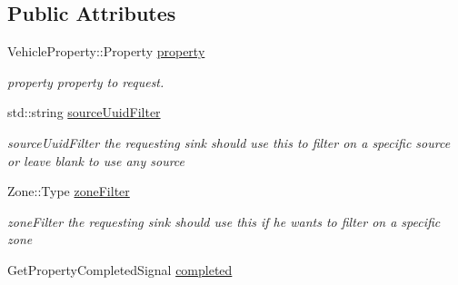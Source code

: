 \subsection*{Public Attributes}
\begin{DoxyCompactItemize}
\item 
\hypertarget{classAsyncPropertyRequest_a221de270e3fb828ddbe821aa484a553f}{Vehicle\-Property\-::\-Property \hyperlink{classAsyncPropertyRequest_a221de270e3fb828ddbe821aa484a553f}{property}}\label{classAsyncPropertyRequest_a221de270e3fb828ddbe821aa484a553f}

\begin{DoxyCompactList}\small\item\em property property to request. \end{DoxyCompactList}\item 
\hypertarget{classAsyncPropertyRequest_a2250e8d29929dd879de141049ec78302}{std\-::string \hyperlink{classAsyncPropertyRequest_a2250e8d29929dd879de141049ec78302}{source\-Uuid\-Filter}}\label{classAsyncPropertyRequest_a2250e8d29929dd879de141049ec78302}

\begin{DoxyCompactList}\small\item\em source\-Uuid\-Filter the requesting sink should use this to filter on a specific source or leave blank to use any source \end{DoxyCompactList}\item 
\hypertarget{classAsyncPropertyRequest_a1a19d4677523d8934abe1ddfec5ba1b7}{Zone\-::\-Type \hyperlink{classAsyncPropertyRequest_a1a19d4677523d8934abe1ddfec5ba1b7}{zone\-Filter}}\label{classAsyncPropertyRequest_a1a19d4677523d8934abe1ddfec5ba1b7}

\begin{DoxyCompactList}\small\item\em zone\-Filter the requesting sink should use this if he wants to filter on a specific zone \end{DoxyCompactList}\item 
\hypertarget{classAsyncPropertyRequest_a12e1115b879ffc69a4d9bfd34df3e4be}{Get\-Property\-Completed\-Signal \hyperlink{classAsyncPropertyRequest_a12e1115b879ffc69a4d9bfd34df3e4be}{completed}}\label{classAsyncPropertyRequest_a12e1115b879ffc69a4d9bfd34df3e4be}


\end{DoxyCompactItemize}
